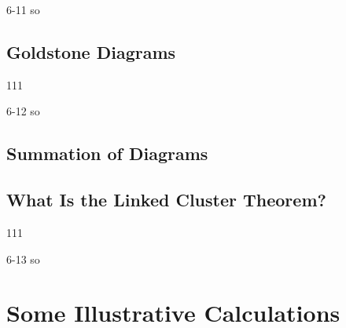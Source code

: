 \documentclass[a4paper]{book}
\begin{document}
	\begin{solution}
		6-11 so
	\end{solution}
	
	\subsection{Goldstone Diagrams}
	
	\begin{exercise}
	111
	\end{exercise}
	
	\begin{solution}
		6-12 so
	\end{solution}
	
	\subsection{Summation of Diagrams}
	
	\subsection{What Is the Linked Cluster Theorem?}
	
	\begin{exercise}
	111
	\end{exercise}
	
	\begin{solution}
		6-13 so
	\end{solution}
	
	\section{Some Illustrative Calculations}
\end{document}
